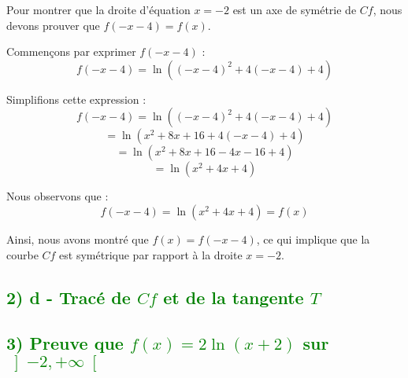 \documentclass[12pt]{article}
\begin{document}
Pour montrer que la droite d'équation \( x = -2 \) est un axe de symétrie de \( Cf \), nous devons prouver que \( f(-x-4) = f(x) \).

Commençons par exprimer \( f(-x-4) \) :
\[
f(-x-4) = \ln((-x-4)^2 + 4(-x-4) + 4)
\]

Simplifions cette expression :
\[
f(-x-4) = \ln((-x-4)^2 + 4(-x-4) + 4)
\]
\[
= \ln(x^2 + 8x + 16 + 4(-x-4) + 4)
\]
\[
= \ln(x^2 + 8x + 16 - 4x - 16 + 4)
\]
\[
= \ln(x^2 + 4x + 4)
\]

Nous observons que :
\[
f(-x-4) = \ln(x^2 + 4x + 4) = f(x)
\]

Ainsi, nous avons montré que \( f(x) = f(-x-4) \), ce qui implique que la courbe \( Cf \) est symétrique par rapport à la droite \( x = -2 \).
\subsection*{\textcolor{green}{2) d - Tracé de \( Cf \) et de la tangente \( T \)}}

\begin{center}
\end{center}

\subsection*{\textcolor{green}{3) Preuve que \( f(x) = 2\ln(x+2) \) sur \( \left]-2, +\infty \right[ \)}}
\end{document}
